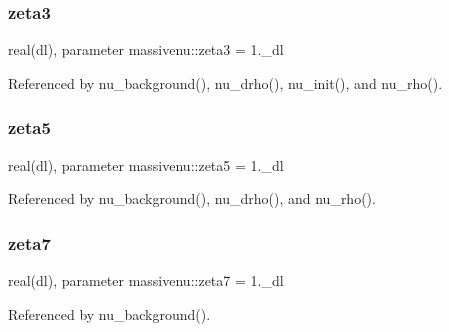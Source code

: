 \subsubsection{\texorpdfstring{zeta3}{zeta3}}
{\footnotesize\ttfamily real(dl), parameter massivenu\+::zeta3 = 1.\+\_\+dl\hspace{0.3cm}{\ttfamily [private]}}



Referenced by nu\+\_\+background(), nu\+\_\+drho(), nu\+\_\+init(), and nu\+\_\+rho().

\mbox{\label{namespacemassivenu_aee270302c33f3b6976ed226a553b26cf}} 
\subsubsection{\texorpdfstring{zeta5}{zeta5}}
{\footnotesize\ttfamily real(dl), parameter massivenu\+::zeta5 = 1.\+\_\+dl\hspace{0.3cm}{\ttfamily [private]}}



Referenced by nu\+\_\+background(), nu\+\_\+drho(), and nu\+\_\+rho().

\mbox{\label{namespacemassivenu_a7d96619046ccc740edb22a9588426c34}} 
\subsubsection{\texorpdfstring{zeta7}{zeta7}}
{\footnotesize\ttfamily real(dl), parameter massivenu\+::zeta7 = 1.\+\_\+dl\hspace{0.3cm}{\ttfamily [private]}}



Referenced by nu\+\_\+background().

